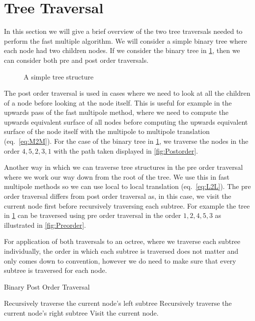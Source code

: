 \section{Tree Traversal}\label{appendix:Tree}
In this section we will give a brief overview of the two tree traversals needed to perform the fast multiple algorithm. We will consider a simple binary tree where each node had two children nodes. If we consider the binary tree in \cref{fig:BlankTree}, then we can consider both pre and post order traversals.
\begin{figure}[ht]
    \centering
    \resizebox{.4\linewidth}{!}{}
    \caption{A simple tree structure}
    \label{fig:BlankTree}
\end{figure}
The post order traversal is used in cases where we need to look at all the children of a node before looking at the node itself. This is useful for example in the upwards pass of the fast multipole method, where we need to compute the upwards equivalent surface of all nodes before computing the upwards equivalent surface of the node itself with the multipole to multipole translation (eq.~\ref{eq:M2M}). For the case of the binary tree in \cref{fig:BlankTree}, we traverse the nodes in the order $4, 5, 2, 3, 1$ with the path taken displayed in \cref{fig:Postorder}.

Another way in which we can traverse tree structures in the pre order traversal where we work our way down from the root of the tree. We use this in fast multipole methods so we can use local to local translation (eq.~\ref{eq:L2L}). The pre order traversal differs from post order traversal as, in this case, we visit the current node first before recursively traversing each subtree. For example the tree in \cref{fig:BlankTree} can be traversed using pre order traversal in the order $1, 2, 4, 5, 3$ as illustrated in \cref{fig:Preorder}.

For application of both traversals to an octree, where we traverse each subtree individually, the order in which each subtree is traversed does not matter and only comes down to convention, however we do need to make sure that every subtree is traversed for each node.

\begin{algorithm}
\caption{Binary Post Order Traversal}
\begin{algorithmic}[1]
\State Recursively traverse the current node's left subtree
\State Recursively traverse the current node's right subtree
\State Visit the current node.
\end{algorithmic}
\end{algorithm}


